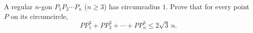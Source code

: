 A regular $n$-gon $P_1P_2\cdots P_n$ ($n\ge3$) has circumradius $1$. Prove that for every point $P$ on its circumcircle,
\[PP_1^3+PP_2^3+\cdots+PP_n^3\le2\sqrt3\,n.\]
